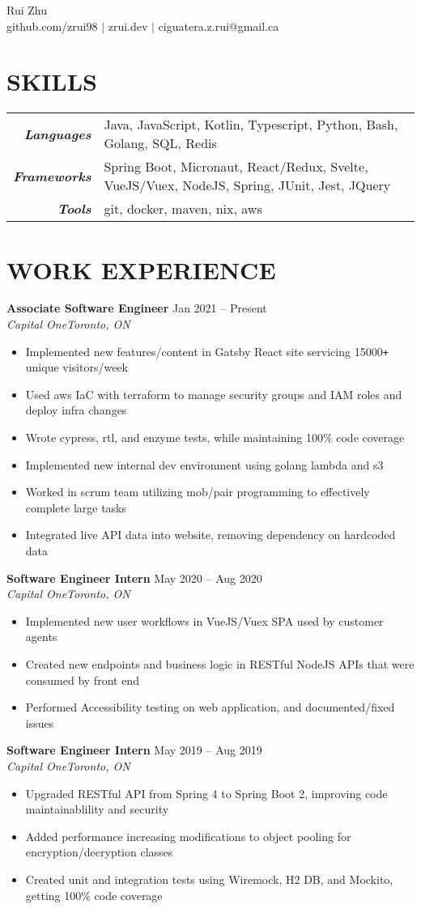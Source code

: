 \documentclass[letterpaper]{article}
\newcommand{\Header}[2]{\begin{center}
	\huge\usefont{OT1}{lmss}{m}{n}
		#1 \\
	\small #2
\end{center}}
\newcommand{\SplitEntry}[2]{\textbf{\textit{#1}} & \small#2\\}
\newcommand{\NewPart}[1]{\section*{\uppercase{\large\textbf{#1}}}}
\newcommand{\DatedEntry}[5]{\textbf{#1}
	\hfill \small#2\\
	\textit{#3}\hfill\textit{#4}\\\vspace{0.1cm}
	#5\vspace{0.1cm}
}
\begin{document}
\Header{Rui Zhu}{github.com/zrui98 $|$ zrui.dev $|$ ciguatera.z.rui@gmail.ca}\vspace{-0.5cm}

\NewPart{Skills}{}
\begin{tabular}{r|l}
	\SplitEntry{Languages}{Java, JavaScript, Kotlin, Typescript, Python, Bash, Golang, SQL, Redis}
	\SplitEntry{Frameworks}{Spring Boot, Micronaut, React/Redux, Svelte, VueJS/Vuex, NodeJS, Spring, JUnit, Jest, JQuery}
	\SplitEntry{Tools}{git, docker, maven, nix, aws}
\end{tabular}\vspace{-0.2cm}

\NewPart{Work Experience}{}
\DatedEntry{Associate Software Engineer}
{Jan 2021 -- Present}
{Capital One}
{Toronto, ON}
{\begin{itemize}[nolistsep]
	\item Implemented new features/content in Gatsby React site servicing 15000\texttt{+} unique visitors/week
	\item Used aws IaC with terraform to manage security groups and IAM roles and deploy infra changes
	\item Wrote cypress, rtl, and enzyme tests, while maintaining 100\% code coverage
	\item Implemented new internal dev environment using golang lambda and s3
	\item Worked in scrum team utilizing mob/pair programming to effectively complete large tasks
	\item Integrated live API data into website, removing dependency on hardcoded data
\end{itemize}}
\DatedEntry{Software Engineer Intern}
{May 2020 -- Aug 2020}
{Capital One}
{Toronto, ON}
{\begin{itemize}[nolistsep]
	\item Implemented new user workflows in VueJS/Vuex SPA used by customer agents
	\item Created new endpoints and business logic in RESTful NodeJS APIs that were consumed by front end
	\item Performed Accessibility testing on web application, and documented/fixed issues
\end{itemize}}
\DatedEntry{Software Engineer Intern}
{May 2019 -- Aug 2019}
{Capital One}
{Toronto, ON}
{\begin{itemize}[nolistsep]
	\item Upgraded RESTful API from Spring 4 to Spring Boot 2, improving code maintainablility and security
	\item Added performance increasing modifications to object pooling for encryption/decryption classes
	\item Created unit and integration tests using Wiremock, H2 DB, and Mockito, getting 100\% code coverage
\end{itemize}}
\end{document}
